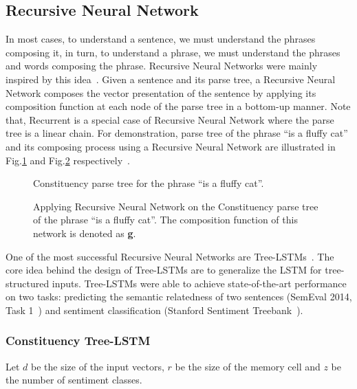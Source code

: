 \subsection{Recursive Neural Network}\label{sec:recursive-nn}
In most cases, to understand a sentence, we must understand the phrases composing it, in turn, to understand a phrase, we must understand the phrases and words composing the phrase.
Recursive Neural Networks were mainly inspired by this idea~\cite{treeLSTM}.
Given a sentence and its parse tree, a Recursive Neural Network composes the vector presentation of the sentence by applying its composition function at each node of the parse tree in a bottom-up manner.
Note that, Recurrent is a special case of Recursive Neural Network where the parse tree is a linear chain.
For demonstration, parse tree of the phrase ``is a fluffy cat'' and its composing process using a Recursive Neural Network are illustrated in Fig.\ref{fig:example-parse} and Fig.\ref{fig:example-compose} respectively~\cite{tag-embedding-rnn}.
\begin{figure}[]
	\centering
	
	\caption[Constituency parse tree for the phrase ``is a fluffy cat'']{Constituency parse tree for the phrase ``is a fluffy cat''.}
	\label{fig:example-parse}
\end{figure}
\begin{figure}[]
	\centering
	
	\caption[Applying Recursive Neural Network on the phrase ``is a fluffy cat'']{Applying Recursive Neural Network on the Constituency parse tree of the phrase ``is a fluffy cat''.
		The composition function of this network is denoted as \textbf{g}.}
	\label{fig:example-compose}
\end{figure}

One of the most successful Recursive Neural Networks are Tree-LSTMs~\cite{treeLSTM}.
The core idea behind the design of Tree-LSTMs are to generalize the LSTM for tree-structured inputs.
Tree-LSTMs were able to achieve state-of-the-art performance on two tasks: predicting the semantic relatedness of two sentences (SemEval 2014, Task 1~\cite{SemeEvalTask1}) and sentiment classification (Stanford Sentiment Treebank~\cite{socher2013recursive}).
\subsubsection{Constituency Tree-LSTM}\label{treelstm}
Let \(d\) be the size of the input vectors, \(r
\) be the size of the memory cell and \(z\) be the number of sentiment classes.
